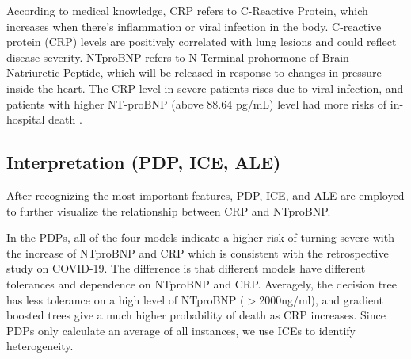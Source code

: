 According to medical knowledge, CRP refers to C-Reactive Protein, which increases when there's inflammation or viral infection in the body. C-reactive protein (CRP) levels are positively correlated with lung lesions and could reflect disease severity\citep{WANG2020332}. NTproBNP refers to N-Terminal prohormone of Brain Natriuretic Peptide, which will be released in response to changes in pressure inside the heart. The CRP level in severe patients rises due to viral infection, and patients with higher NT-proBNP (above 88.64 pg/mL) level had more risks of in-hospital death \citep{Gao2020.03.07.20031575}.



\subsection{Interpretation (PDP, ICE, ALE)}

After recognizing the most important features, PDP, ICE, and ALE are employed to further visualize the relationship between CRP and NTproBNP.

In the PDPs, all of the four models indicate a higher risk of turning severe with the increase of NTproBNP and CRP which is consistent with the retrospective study on COVID-19. The difference is that different models have different tolerances and dependence on NTproBNP and CRP. Averagely, the decision tree has less tolerance on a high level of NTproBNP ($>$2000ng/ml), and gradient boosted trees give a much higher probability of death as CRP increases. Since PDPs only calculate an average of all instances, we use ICEs to identify heterogeneity.


